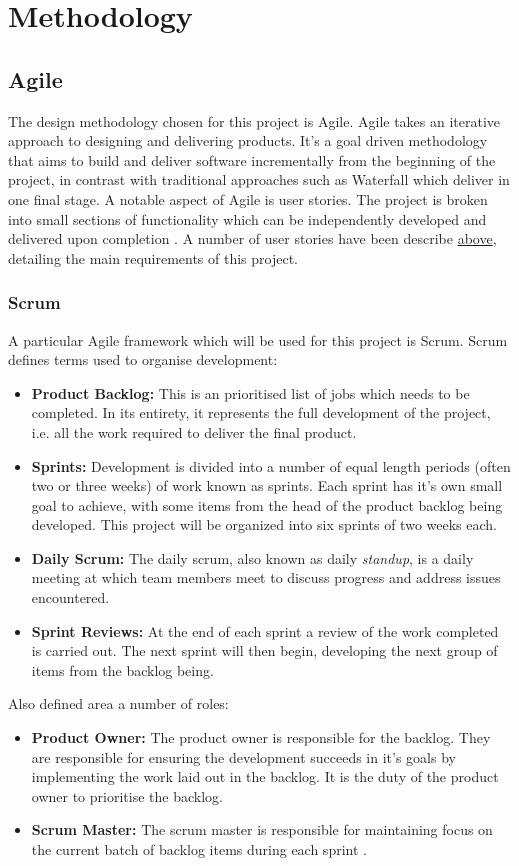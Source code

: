 
\section{Methodology}
	\subsection{Agile}
	The design methodology chosen for this project is Agile. Agile takes an iterative approach to designing and delivering products. It's a goal driven methodology that aims to build and deliver software incrementally from the beginning of the project, in contrast with traditional approaches such as Waterfall which deliver in one final stage. A notable aspect of Agile is user stories. The project is broken into small sections of functionality which can be independently developed and delivered upon completion \citep{rasmusson}. A number of user stories have been describe \hyperref[user-stories]{above}, detailing the main requirements of this project. 
	
	\subsubsection{Scrum}
	
	A particular Agile framework which will be used for this project is Scrum. Scrum defines terms used to organise development:
	\begin{itemize}
		\item \textbf{Product Backlog:} This is an prioritised list of jobs which needs to be completed. In its entirety, it represents the full development of the project, i.e. all the work required to deliver the final product.
		\item \textbf{Sprints:} Development is divided into a number of equal length periods (often two or three weeks) of work known as sprints. Each sprint has it's own small goal to achieve, with some items from the head of the product backlog being developed. This project will be organized into six sprints of two weeks each.
		\item \textbf{Daily Scrum:} The daily scrum, also known as daily \textit{standup}, is a daily meeting at which team members meet to discuss progress and address issues encountered.
		\item \textbf{Sprint Reviews:} At the end of each sprint a review of the work completed is carried out. The next sprint will then begin, developing the next group of items from the backlog being\citep{scrum}.
	\end{itemize}
	Also defined area a number of roles:
	\begin{itemize}
		\item \textbf{Product Owner:} The product owner is responsible for the backlog. They are responsible for ensuring the development succeeds in it's goals by implementing the work laid out in the backlog. It is the duty of the product owner to prioritise the backlog. 
		\item \textbf{Scrum Master:} The scrum master is responsible for maintaining focus on the current batch of backlog items during each sprint \cite{agile}.
	\end{itemize}
	
